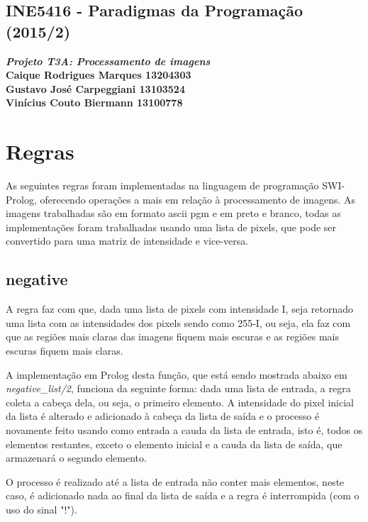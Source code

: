 \documentclass{article}
\begin{document}
\lstset{language=Prolog} %

\begin{center} 
    \section*{INE5416 - Paradigmas da Programação (2015/2)}
    \textbf{\textit{Projeto T3A: Processamento de imagens} \\
    Caique Rodrigues Marques 13204303 \\ 
    Gustavo José Carpeggiani 13103524 \\
    Vinícius Couto Biermann  13100778}
\end{center}

\section*{Regras}
    As seguintes regras foram implementadas na linguagem de programação SWI-Prolog, oferecendo operações a mais em relação à processamento de imagens. As imagens trabalhadas são em formato ascii pgm e em preto e branco, todas as implementações foram trabalhadas usando uma lista de pixels, que pode ser convertido para uma matriz de intensidade e vice-versa.
    
    \subsection*{negative}
        A regra faz com que, dada uma lista de pixels com intensidade I, seja retornado uma lista com as intensidades dos pixels sendo como 255-I, ou seja, ela faz com que as regiões mais claras das imagens fiquem mais escuras e as regiões mais escuras fiquem mais claras.

        A implementação em Prolog desta função, que está sendo mostrada abaixo em \textit{negative\_list/2}, funciona da seguinte forma: dada uma lista de entrada, a regra coleta a cabeça dela, ou seja, o primeiro elemento. A intensidade do pixel inicial da lista é alterado e adicionado à cabeça da lista de saída e o processo é novamente feito usando como entrada a cauda da lista de entrada, isto é, todos os elementos restantes, exceto o elemento inicial e a cauda da lista de saída, que armazenará o segundo elemento.

        O processo é realizado até a lista de entrada não conter mais elementos, neste caso, é adicionado nada ao final da lista de saída e a regra é interrompida (com o uso do sinal "!").
\end{document}

